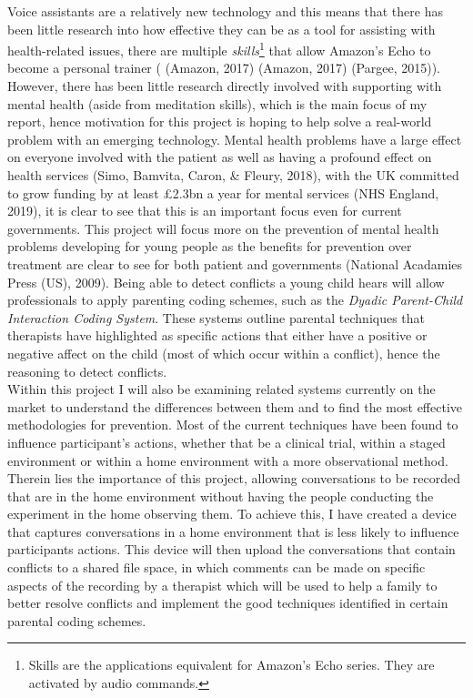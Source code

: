 \documentclass[a4paper,11pt]{report}
\begin{document}
Voice assistants are a relatively new technology and this means that there has been little research into how effective they can be as a tool for assisting with health-related issues, there are multiple \textit{skills}\footnote{Skills are the applications equivalent for Amazon’s Echo series. They are activated by audio commands.} that allow Amazon’s Echo to become a personal trainer ( (Amazon, 2017) (Amazon, 2017) (Pargee, 2015)). However, there has been little research directly involved with supporting with mental health (aside from meditation skills), which is the main focus of my report, hence motivation for this project is hoping to help solve a real-world problem with an emerging technology. Mental health problems have a large effect on everyone involved with the patient as well as having a profound effect on health services (Simo, Bamvita, Caron, \& Fleury, 2018), with the UK committed to grow funding by at least £2.3bn a year for mental services (NHS England, 2019), it is clear to see that this is an important focus even for current governments. This project will focus more on the prevention of mental health problems developing for young people as the benefits for prevention over treatment are clear to see for both patient and governments (National Acadamies Press (US), 2009). Being able to detect conflicts a young child hears will allow professionals to apply parenting coding schemes, such as the\textit{ Dyadic Parent-Child Interaction Coding System}. These systems outline parental techniques that therapists have highlighted as specific actions that either have a positive or negative affect on the child (most of which occur within a conflict), hence the reasoning to detect conflicts. \\
 
Within this project I will also be examining related systems currently on the market to understand the differences between them and to find the most effective methodologies for prevention. Most of the current techniques have been found to influence participant’s actions, whether that be a clinical trial, within a staged environment or within a home environment with a more observational method. Therein lies the importance of this project, allowing conversations to be recorded that are in the home environment without having the people conducting the experiment in the home observing them. To achieve this, I have created a device that captures conversations in a home environment that is less likely to influence participants actions. This device will then upload the conversations that contain conflicts to a shared file space, in which comments can be made on specific aspects of the recording by a therapist which will be used to help a family to better resolve conflicts and implement the good techniques identified in certain parental coding schemes.\\
\end{document}
